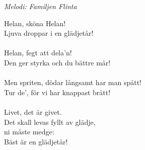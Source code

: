 {\footnotesize\textit{Melodi: Familjen Flinta}}\par
\vspace{10pt}
Helan, sköna Helan!\\
Ljuva droppar i en glädjetår!\\
\\
Helan, fegt att dela'n!\\
Den ger styrka och du bättre mår!\\
\\
Men spriten, dödar långsamt har man spått!\\
Tur de', för vi har knappast brått!\\
\\
Livet, det är givet.\\
Det skall levas fyllt av glädje,\\
ni måste medge:\\
Bäst är en glädjetår!
